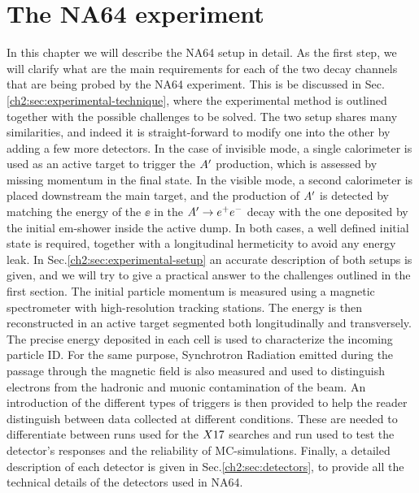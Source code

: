 
\newcommand{\pdirtwo}{chapters/plots/chapter2}

\chapter{The NA64 experiment} %

\label{chapter2} %


In this chapter we will describe the NA64 setup in detail. As the first step, we will clarify what are the main requirements for each of the two decay channels that are being probed by the NA64 experiment. This is be discussed in Sec.\ref{ch2:sec:experimental-technique}, where the experimental method is outlined together with the possible challenges to be solved. The two setup shares many similarities, and indeed it is straight-forward to modify one into the other by adding a few more detectors. In the case of invisible mode, a single calorimeter is used as an active target to trigger the $A'$ production, which is assessed by missing momentum in the final state. In the visible mode, a second calorimeter is placed downstream the main target, and the production of $A'$ is detected by matching the energy of the $\ee$ in the $A' \to e^+e^-$ decay with the one deposited by the initial em-shower inside the active dump. In both cases, a well defined initial state is required, together with a longitudinal hermeticity to avoid any energy leak. In Sec.\ref{ch2:sec:experimental-setup} an accurate description of both setups is given, and we will try to give a practical answer to the challenges outlined in the first section. The initial particle momentum is measured using a magnetic spectrometer with high-resolution tracking stations. The energy is then reconstructed in an active target segmented both longitudinally and transversely. The precise energy deposited in each cell is used to characterize the incoming particle ID. For the same purpose, Synchrotron Radiation emitted during the passage through the magnetic field is also measured and used to distinguish electrons from the hadronic and muonic contamination of the beam. An introduction of the different types of triggers is then provided to help the reader distinguish between data collected at different conditions. These are needed to differentiate between runs used for the $X17$ searches and run used to test the detector's responses and the reliability of MC-simulations.
Finally, a detailed description of each detector is given in Sec.\ref{ch2:sec:detectors}, to provide all the technical details of the detectors used in NA64. 

